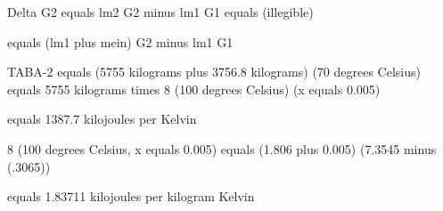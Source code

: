 Delta G2 equals lm2 G2 minus lm1 G1 equals (illegible)

equals (lm1 plus mein) G2 minus lm1 G1

TABA-2 equals (5755 kilograms plus 3756.8 kilograms) (70 degrees Celsius) equals 5755 kilograms times 8 (100 degrees Celsius) (x equals 0.005)

equals 1387.7 kilojoules per Kelvin

8 (100 degrees Celsius, x equals 0.005) equals (1.806 plus 0.005) (7.3545 minus (.3065))

equals 1.83711 kilojoules per kilogram Kelvin